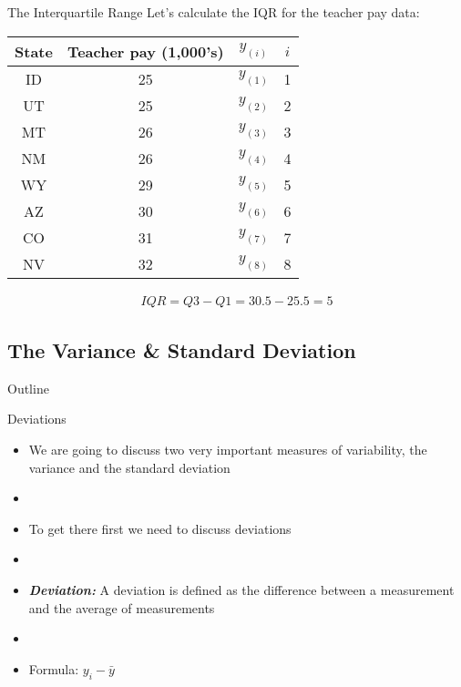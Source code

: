\documentclass[xcolor=dvipsnames]{beamer}
\begin{document}
\begin{frame}{The Interquartile Range}
Let's calculate the IQR for the teacher pay data:
		\begin{center}
			\begin{tabular}{|c|c|c|c|}
				\hline 
				\textbf{State} & \textbf{Teacher pay (1,000's)} & $y_{(i)}$ & $i$ \\ 
				\hline \hline 
				ID & 25 & $y_{(1)}$& 1 \\  \hline 
				UT &  25  & $y_{(2)}$& 2\\ \hline 
				MT &  26  & $y_{(3)}$& 3\\ \hline 
				NM &  26  & $y_{(4)}$& 4\\ \hline 
				WY &  29  & $y_{(5)}$& 5\\ \hline 
				AZ & 30  & $y_{(6)}$& 6\\ \hline 
				CO &  31 & $y_{(7)}$& 7\\ \hline
				NV & 32  & $y_{(8)}$& 8\\ \hline 
			\end{tabular} 
		\end{center}
	\begin{gather*}
		IQR = Q3 - Q1 = 30.5 - 25.5 = 5
	\end{gather*}
\end{frame}

\subsection{The Variance \& Standard Deviation}
\begin{frame}{Outline}
	\tableofcontents[currentsection,subsectionstyle=show/shaded/hide]
\end{frame}

\begin{frame}{Deviations}
	\begin{itemize}
		\item We are going to discuss two very important measures of variability, the variance and the standard deviation
		\item[]
		\item To get there first we need to discuss deviations
		\item[]
		\item \textbf{\emph{Deviation:}} A deviation is defined as the difference between a measurement and the average of measurements
		\item[]
		\item Formula: $y_i - \bar{y}$
	\end{itemize}
\end{frame}
\end{document}
